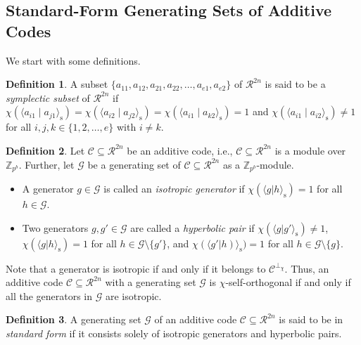 \documentclass{article}
\theoremstyle{remark}
\theoremstyle{definition}
\newtheorem{defin}{Definition}[section]
\numberwithin{equation}{section}
\begin{document}
\subsection{Standard-Form Generating Sets of Additive Codes}
We start with some definitions.
\begin{defin} \label{def:sympl} A subset $\{a_{11},a_{12},a_{21},a_{22},\ldots,a_{e1},a_{e2}\}$
 of $\mathcal{R}^{2n}$ is said to be a \emph{symplectic subset} of $\mathcal{R}^{2n}$ if
  $\chi(\langle a_{i1} \mid a_{j1} \rangle_{\mathrm{s}}) = \chi(\langle a_{i2} \mid a_{j2} \rangle_{\mathrm{s}}) = \chi(\langle a_{i1} \mid a_{k 2} \rangle_{\mathrm{s}}) = 1$ and  $\chi(\langle a_{i1} \mid a_{i2} \rangle_{\mathrm{s}})\neq1$ for all $i ,j, k \in \{1,2,\ldots,e\}$ with $i \neq k.$
 \end{defin}

\begin{defin} Let $\mathcal{C} \subseteq \mathcal{R}^{2n}$ be an additive code, i.e.,  $\mathcal{C} \subseteq \mathcal{R}^{2n}$ is a module over $\mathbb{Z}_{p^b}.$ Further, let $\mathcal{G}$ be a generating set of  $\mathcal{C} \subseteq \mathcal{R}^{2n}$ as a $\mathbb{Z}_{p^b}$-module.
\begin{itemize}
\item A generator $g \in \mathcal{G}$ is called an \emph{isotropic generator} if  $\chi(\langle g | h \rangle_{\mathrm{s}})=1$ for all $h \in \mathcal{G}.$
\item Two generators $g,g' \in \mathcal{G}$ are called a \emph{hyperbolic pair} if $\chi(\langle g | g' \rangle_{\mathrm{s}})\neq1$, $\chi(\langle g| h \rangle_{\mathrm{s}})= 1$ for all $h \in \mathcal{G} \setminus \{g'\}$, and $\chi(\langle g'| h)\rangle_{\mathrm{s}})=1$ for all $h \in \mathcal{G} \setminus \{g\}$.
\end{itemize}  
\end{defin}
 
Note that a generator is isotropic if and only if  it belongs to $\mathcal{C}^{\perp_\chi}$. Thus, an additive code $\mathcal{C} \subseteq \mathcal{R}^{2n}$ with a generating set $\mathcal{G}$ is $\chi$-self-orthogonal if and only if all the generators in $\mathcal{G}$ are isotropic. 

\begin{defin} 
A generating set $\mathcal{G}$ of an additive code $\mathcal{C} \subseteq \mathcal{R}^{2n}$ is said to be in \emph{standard form} if it consists solely of isotropic generators and hyperbolic pairs.
\label{def:stdform}
\end{defin}
\end{document}
